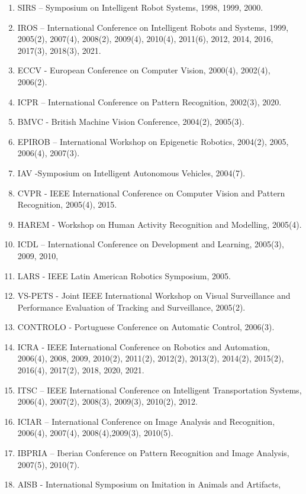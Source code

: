 \documentclass[
]{article}
\begin{document}
\begin{enumerate}
\def\labelenumi{\arabic{enumi}.}
\item
  SIRS -- Symposium on Intelligent Robot Systems, 1998, 1999, 2000.
\item
  IROS -- International Conference on Intelligent Robots and Systems,
  1999, 2005(2), 2007(4), 2008(2), 2009(4), 2010(4), 2011(6), 2012,
  2014, 2016, 2017(3), 2018(3), 2021.
\item
  ECCV - European Conference on Computer Vision, 2000(4), 2002(4),
  2006(2).
\item
  ICPR -- International Conference on Pattern Recognition, 2002(3),
  2020.
\item
  BMVC - British Machine Vision Conference, 2004(2), 2005(3).
\item
  EPIROB -- International Workshop on Epigenetic Robotics, 2004(2),
  2005, 2006(4), 2007(3).
\item
  IAV -Symposium on Intelligent Autonomous Vehicles, 2004(7).
\item
  CVPR - IEEE International Conference on Computer Vision and Pattern
  Recognition, 2005(4), 2015.
\item
  HAREM - Workshop on Human Activity Recognition and Modelling, 2005(4).
\item
  ICDL -- International Conference on Development and Learning, 2005(3),
  2009, 2010,
\item
  LARS - IEEE Latin American Robotics Symposium, 2005.
\item
  VS-PETS - Joint IEEE International Workshop on Visual Surveillance and
  Performance Evaluation of Tracking and Surveillance, 2005(2).
\item
  CONTROLO - Portuguese Conference on Automatic Control, 2006(3).
\item
  ICRA - IEEE International Conference on Robotics and Automation,
  2006(4), 2008, 2009, 2010(2), 2011(2), 2012(2), 2013(2), 2014(2),
  2015(2), 2016(4), 2017(2), 2018, 2020, 2021.
\item
  ITSC -- IEEE International Conference on Intelligent Transportation
  Systems, 2006(4), 2007(2), 2008(3), 2009(3), 2010(2), 2012.
\item
  ICIAR -- International Conference on Image Analysis and Recognition,
  2006(4), 2007(4), 2008(4),2009(3), 2010(5).
\item
  IBPRIA -- Iberian Conference on Pattern Recognition and Image
  Analysis, 2007(5), 2010(7).
\item
  AISB - International Symposium on Imitation in Animals and Artifacts,

\end{enumerate}
\end{document}
